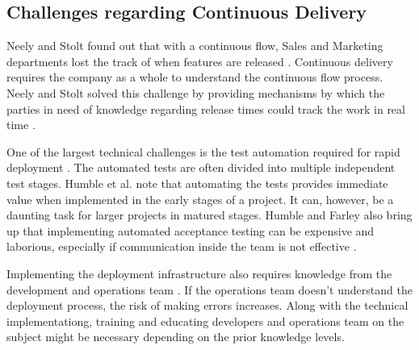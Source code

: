 \documentclass[english]{tktltiki2}
\theoremstyle{definition}
\theoremstyle{remark}
\begin{document}

\subsection{Challenges regarding Continuous Delivery}
Neely and Stolt found out that with a continuous flow, Sales and Marketing departments lost the track of when features are released \cite{neely2013continuous}. Continuous delivery requires the company as a whole to understand the continuous flow process. Neely and Stolt solved this challenge by providing mechanisms by which the parties in need of knowledge regarding release times could track the work in real time \cite{neely2013continuous}. 

One of the largest technical challenges is the test automation required for rapid deployment \cite{humble2006deployment, cdbook}. The automated tests are often divided into multiple independent test stages. Humble et al. note that automating the tests provides immediate value when implemented in the early stages of a project. It can, however, be a daunting task for larger projects in matured stages. Humble and Farley also bring up that implementing automated acceptance testing can be expensive and laborious, especially if communication inside the team is not effective \cite{cdbook}. 

Implementing the deployment infrastructure also requires knowledge from the development and operations team \cite{cdbook}. If the operations team doesn't understand the deployment process, the risk of making errors increases. Along with the technical implementationg, training and educating developers and operations team on the subject might be necessary depending on the prior knowledge levels.
\end{document}
